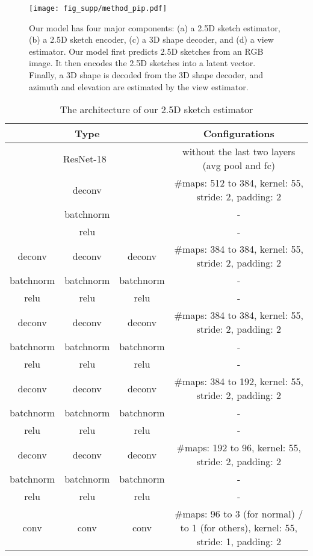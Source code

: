 \documentclass[10pt,twocolumn,letterpaper]{article}
\begin{document}
\begin{figure*}[t]
\centering
\texttt{[image: fig\_supp/method\_pip.pdf]}
\vspace{-20pt}
\caption{Our model has four major components: (a) a 2.5D sketch estimator, (b) a 2.5D sketch encoder, (c) a 3D shape decoder, and (d) a view estimator. Our model first predicts 2.5D sketches from an RGB image. It then encodes the 2.5D sketches into a latent vector. Finally, a 3D shape is decoded from the 3D shape decoder, and azimuth and elevation are estimated by the view estimator.}
\label{fig:method_pip}
\vspace{-5pt}
\end{figure*} \begin{table*}[t]
 	\centering
    \begin{tabular}{cccc}
    \toprule
    \multicolumn{3}{c}{Type} & Configurations\\
    \midrule
    \multicolumn{3}{c}{ResNet-18~\cite{He2015Deep}} & without the last two layers (avg pool and fc) \\
    \multicolumn{3}{c}{deconv} & \#maps: 512 to 384, kernel: 55, stride: 2, padding: 2 \\
    \multicolumn{3}{c}{batchnorm} & - \\
    \multicolumn{3}{c}{relu} & - \\
    deconv & deconv & deconv & \#maps: 384 to 384, kernel: 55, stride: 2, padding: 2 \\
    batchnorm & batchnorm & batchnorm & - \\
    relu & relu & relu & - \\
    deconv & deconv & deconv & \#maps: 384 to 384, kernel: 55, stride: 2, padding: 2 \\
    batchnorm & batchnorm & batchnorm & - \\
    relu & relu & relu & - \\
    deconv & deconv & deconv & \#maps: 384 to 192, kernel: 55, stride: 2, padding: 2 \\
    batchnorm & batchnorm & batchnorm & - \\
    relu & relu & relu & - \\
    deconv & deconv & deconv & \#maps: 192 to 96, kernel: 55, stride: 2, padding: 2 \\
    batchnorm & batchnorm & batchnorm & - \\
    relu & relu & relu & - \\
    conv & conv & conv & \#maps: 96 to 3 (for normal) / to 1 (for others), kernel: 55, stride: 1, padding: 2 \\
    \bottomrule
    \end{tabular}
    \caption{The architecture of our 2.5D sketch estimator}
    \label{tbl:net_12}
\end{table*}
 \newpage
\renewcommand\thesection{\Alph{section}}
\setcounter{section}{0} 
\end{document}
